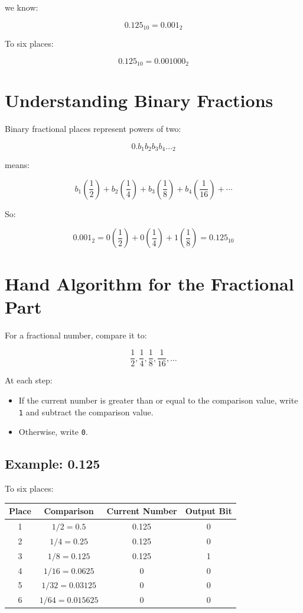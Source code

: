 \documentclass[11pt]{article}
\begin{document}
we know:

\[
0.125_{10} = 0.001_2
\]

To six places:

\[
0.125_{10} = 0.001000_2
\]

\section{Understanding Binary Fractions}

Binary fractional places represent powers of two:

\[
0.b_1b_2b_3b_4\ldots_2
\]

means:

\[
b_1\left(\frac{1}{2}\right)
+
b_2\left(\frac{1}{4}\right)
+
b_3\left(\frac{1}{8}\right)
+
b_4\left(\frac{1}{16}\right)
+\cdots
\]

So:

\[
0.001_2 = 0\left(\frac{1}{2}\right)
+0\left(\frac{1}{4}\right)
+1\left(\frac{1}{8}\right)
=
0.125_{10}
\]

\section{Hand Algorithm for the Fractional Part}

For a fractional number, compare it to:

\[
\frac{1}{2}, \frac{1}{4}, \frac{1}{8}, \frac{1}{16}, \ldots
\]

At each step:

\begin{itemize}
    \item If the current number is greater than or equal to the comparison value, write \texttt{1} and subtract the comparison value.
    \item Otherwise, write \texttt{0}.
\end{itemize}

\subsection{Example: 0.125}

To six places:

\begin{center}
\begin{tabular}{cccc}
\toprule
Place & Comparison & Current Number & Output Bit \\
\midrule
1 & $1/2 = 0.5$      & 0.125 & 0 \\
2 & $1/4 = 0.25$     & 0.125 & 0 \\
3 & $1/8 = 0.125$    & 0.125 & 1 \\
4 & $1/16 = 0.0625$  & 0     & 0 \\
5 & $1/32 = 0.03125$ & 0     & 0 \\
6 & $1/64 = 0.015625$& 0     & 0 \\
\bottomrule
\end{tabular}
\end{center}
\end{document}
